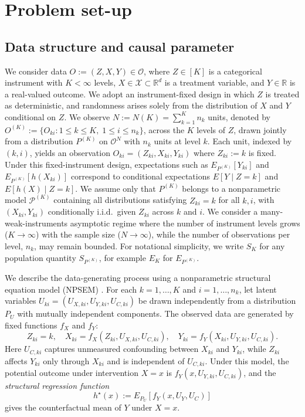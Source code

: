 \documentclass[11pt]{article}
\theoremstyle{plain}
\theoremstyle{definition}
\theoremstyle{remark}
\theoremstyle{definition}
\begin{document}
 


\section{Problem set-up}\label{sec:setup}
\subsection{Data structure and causal parameter}

 



We consider data \( O := (Z, X, Y) \in \mathcal{O} \), where \( Z \in [K] \) is a categorical instrument with \( K < \infty \) levels, \( X \in \mathcal{X} \subset \mathbb{R}^d \) is a treatment variable, and \( Y \in \mathbb{R} \) is a real-valued outcome. We adopt an instrument-fixed design in which \(Z\) is treated as deterministic, and randomness arises solely from the distribution of \(X\) and \(Y\) conditional on \(Z\). We observe \( N := N(K) = \sum_{k=1}^K n_k \) units, denoted by \( O^{(K)} := \{O_{ki} : 1 \leq k \leq K,\; 1 \leq i \leq n_k\} \), across the \(K\) levels of \(Z\), drawn jointly from a distribution \( P^{(K)} \) on \( \mathcal{O}^N \) with \( n_k \) units at level \(k\). Each unit, indexed by \((k,i)\), yields an observation \( O_{ki} = (Z_{ki}, X_{ki}, Y_{ki}) \) where \( Z_{ki} := k \) is fixed. Under this fixed-instrument design, expectations such as \( E_{P^{(K)}}[Y_{ki}] \) and \( E_{P^{(K)}}[h(X_{ki})] \) correspond to conditional expectations \( E[Y \mid Z = k] \) and \( E[h(X) \mid Z = k] \). We assume only that \( P^{(K)} \) belongs to a nonparametric model \( \mathcal{P}^{(K)} \) containing all distributions satisfying \( Z_{ki} = k \) for all \( k,i \), with \( (X_{ki}, Y_{ki}) \) conditionally i.i.d.\ given \( Z_{ki} \) across \(k\) and \(i\). We consider a many-weak-instruments asymptotic regime where the number of instrument levels grows (\( K \to \infty \)) with the sample size (\( N \to \infty \)), while the number of observations per level, \(n_k\), may remain bounded. For notational simplicity, we write \( S_K \) for any population quantity \( S_{P^{(K)}} \), for example \( E_K \) for \( E_{P^{(K)}} \).

We describe the data-generating process using a nonparametric structural equation model (NPSEM) \citep{pearl2009causality}. For each \(k = 1, \ldots, K\) and \(i = 1, \ldots, n_k\), let latent variables \(U_{ki} = (U_{X,ki}, U_{Y,ki}, U_{C,ki})\) be drawn independently from a distribution \(P_U\) with mutually independent components. The observed data are generated by fixed functions \(f_X\) and \(f_Y\):
\[
Z_{ki} = k, \quad 
X_{ki} = f_X(Z_{ki}, U_{X,ki}, U_{C,ki}), \quad 
Y_{ki} = f_Y(X_{ki}, U_{Y,ki}, U_{C,ki}).
\]
Here \(U_{C,ki}\) captures unmeasured confounding between \(X_{ki}\) and \(Y_{ki}\), while \(Z_{ki}\) affects \(Y_{ki}\) only through \(X_{ki}\) and is independent of \(U_{C,ki}\). Under this model, the potential outcome under intervention \(X = x\) is \(f_Y(x, U_{Y,ki}, U_{C,ki})\), and the \emph{structural regression function}
\begin{equation}
h^\star(x) := E_{P_U}[f_Y(x, U_Y, U_C)]
\end{equation}
gives the counterfactual mean of \(Y\) under \(X = x\).
\end{document}
